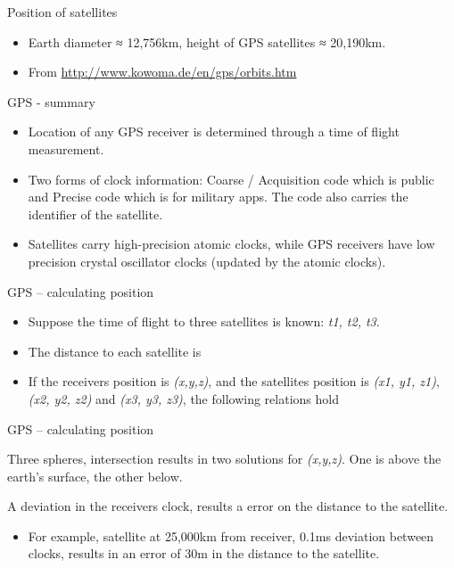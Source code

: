 \documentclass[compress]{beamer}
\begin{document}
\begin{frame}{Position of satellites}

\begin{itemize}

\item
  Earth diameter ≈ 12,756km, height of GPS satellites ≈ 20,190km.
\item
  From \url{http://www.kowoma.de/en/gps/orbits.htm}
\end{itemize}

\end{frame}

\begin{frame}{GPS - summary}

\begin{itemize}

\item
  Location of any GPS receiver is determined through a time of flight
  measurement.
\item
  Two forms of clock information: Coarse / Acquisition code which is
  public and Precise code which is for military apps. The code also
  carries the identifier of the satellite.
\item
  Satellites carry high-precision atomic clocks, while GPS receivers
  have low precision crystal oscillator clocks (updated by the atomic
  clocks).
\end{itemize}

\end{frame}

\begin{frame}{GPS -- calculating position}

\begin{itemize}

\item
  Suppose the time of flight to three satellites is known: \emph{t1, t2,
  t3}.
\item
  The distance to each satellite is
\item
  If the receivers position is \emph{(x,y,z)}, and the satellites
  position is \emph{(x1, y1, z1)}, \emph{(x2, y2, z2)} and \emph{(x3,
  y3, z3)}, the following relations hold
\end{itemize}

\end{frame}

\begin{frame}{GPS -- calculating position}

Three spheres, intersection results in two solutions for \emph{(x,y,z)}.
One is above the earth's surface, the other below.

A deviation in the receivers clock, results a error on the distance to
the satellite.

\begin{itemize}

\item
  For example, satellite at 25,000km from receiver, 0.1ms deviation
  between clocks, results in an error of 30m in the distance to the
  satellite.
\end{itemize}

\end{frame}
\end{document}
